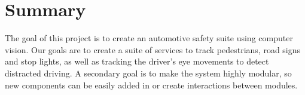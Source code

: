 \section{Summary}

The goal of this project is to create an automotive safety suite using computer vision.
Our goals are to create a suite of services to track pedestrians, road signs and stop lights, as well as tracking the driver's eye movements to detect distracted driving.
A secondary goal is to make the system highly modular, so new components can be easily added in or create interactions between modules.